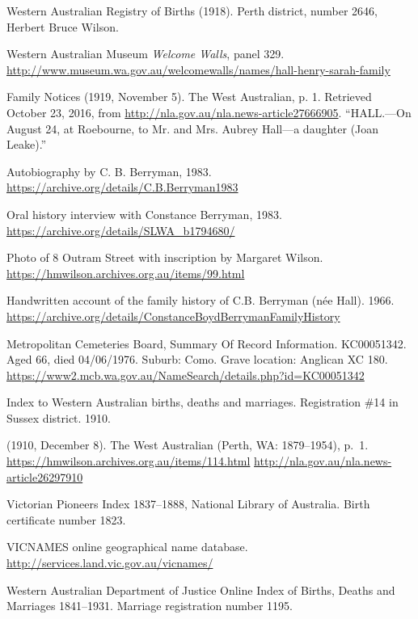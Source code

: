 \begin{thebibliography}{999}
\footnotesize

    Western Australian Registry of Births (1918). Perth district, number 2646, Herbert Bruce Wilson.

	Western Australian Museum \emph{Welcome Walls}, panel 329.
	\url{http://www.museum.wa.gov.au/welcomewalls/names/hall-henry-sarah-family}

	Family Notices (1919, November 5). The West Australian, p. 1.
	Retrieved October 23, 2016, from \url{http://nla.gov.au/nla.news-article27666905}.
	``HALL.---On August 24, at Roebourne, to Mr. and Mrs. Aubrey Hall---a daughter (Joan Leake).''

	Autobiography by C. B. Berryman, 1983.
	\url{https://archive.org/details/C.B.Berryman1983}

	Oral history interview with Constance Berryman, 1983.
	\url{https://archive.org/details/SLWA_b1794680/}

	Photo of 8 Outram Street with inscription by Margaret Wilson.
	\url{https://hmwilson.archives.org.au/items/99.html}

	Handwritten account of the family history of C.B. Berryman (n\'{e}e Hall). 1966.
	\url{https://archive.org/details/ConstanceBoydBerrymanFamilyHistory}

	Metropolitan Cemeteries Board, Summary Of Record Information. KC00051342.
	Aged 66, died 04/06/1976. Suburb: Como.
	Grave location: Anglican XC 180.
	\url{https://www2.mcb.wa.gov.au/NameSearch/details.php?id=KC00051342}

	Index to Western Australian births, deaths and marriages.
	Registration \#14 in Sussex district. 1910.

	 (1910, December 8). The West Australian (Perth, WA: 1879--1954), p.\ 1.
	\url{https://hmwilson.archives.org.au/items/114.html}
	\url{http://nla.gov.au/nla.news-article26297910}

	Victorian Pioneers Index 1837--1888, National Library of Australia.
	Birth certificate number 1823.

	VICNAMES online geographical name database.
	\url{http://services.land.vic.gov.au/vicnames/}

	Western Australian Department of Justice Online Index of Births, Deaths and Marriages 1841–1931.
	Marriage registration number 1195.


\end{thebibliography}
